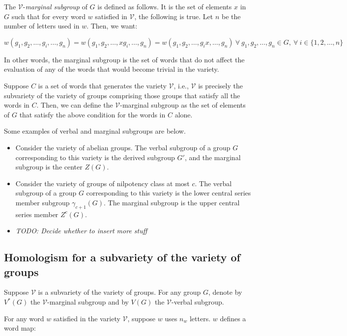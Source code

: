 \documentclass{ucetd}
\begin{document}
The $\mathcal{V}$-{\em marginal subgroup} of $G$ is defined as
follows. It is the set of elements $x$ in $G$ such that for every word
$w$ satisfied in $\mathcal{V}$, the following is true. Let $n$ be the number of letters used in $w$. Then, we want:

$$w(g_1,g_2,\dots,g_i, \dots,g_n) = w(g_1,g_2,\dots,xg_i,\dots,g_n) = w(g_1,g_2,\dots,g_ix,\dots,g_n) \ \forall \ g_1,g_2,\dots,g_n \in G, \ \forall \ i \in \{ 1,2,\dots,n\}$$

In other words, the marginal subgroup is the set of words that do not
affect the evaluation of any of the words that would become trivial in
the variety.

Suppose $C$ is a set of words that generates the variety
$\mathcal{V}$, i.e., $\mathcal{V}$ is precisely the subvariety of the
variety of groups comprising those groups that satisfy all the words
in $C$. Then, we can define the $\mathcal{V}$-marginal subgroup as the
set of elements of $G$ that satisfy the above condition for the words
in $C$ alone.

Some examples of verbal and marginal subgroups are below.

\begin{itemize}
\item Consider the variety of abelian groups. The verbal subgroup of a
  group $G$ corresponding to this variety is the derived subgroup
  $G'$, and the marginal subgroup is the center $Z(G)$.
\item Consider the variety of groups of nilpotency class at most
  $c$. The verbal subgroup of a group $G$ corresponding to this
  variety is the lower central series member subgroup
  $\gamma_{c+1}(G)$. The marginal subgroup is the upper central series
  member $Z^c(G)$.
\item {\em TODO: Decide whether to insert more stuff}
\end{itemize}

\subsection{Homologism for a subvariety of the variety of groups}

Suppose $\mathcal{V}$ is a subvariety of the variety of groups. For any
group $G$, denote by $V^*(G)$ the $\mathcal{V}$-marginal subgroup and
by $V(G)$ the $\mathcal{V}$-verbal subgroup.

For any word $w$ satisfied in the variety $\mathcal{V}$, suppose $w$
uses $n_w$ letters. $w$ defines a word map:
\end{document}
